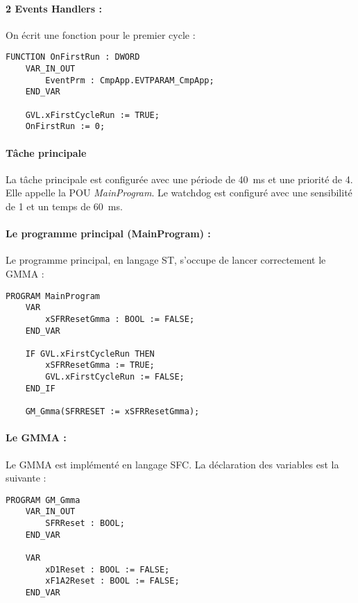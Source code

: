 \paragraph{2 Events Handlers :}
On écrit une fonction pour le premier cycle :
\begin{lstlisting}[language=ST]
FUNCTION OnFirstRun : DWORD
    VAR_IN_OUT
        EventPrm : CmpApp.EVTPARAM_CmpApp;
    END_VAR

    GVL.xFirstCycleRun := TRUE;
    OnFirstRun := 0;\end{lstlisting}

\paragraph{Tâche principale}
La tâche principale est configurée avec une période de \SI{40}{\milli\second} et une priorité de 4. Elle appelle la POU \emph{MainProgram}. Le watchdog est configuré avec une sensibilité de 1 et un temps de \SI{60}{\milli\second}.

\paragraph{Le programme principal (MainProgram) :}
Le programme principal, en langage ST, s'occupe de lancer correctement le GMMA :
\begin{lstlisting}[language=ST]
PROGRAM MainProgram
    VAR
        xSFRResetGmma : BOOL := FALSE;
    END_VAR

    IF GVL.xFirstCycleRun THEN
        xSFRResetGmma := TRUE;
        GVL.xFirstCycleRun := FALSE;
    END_IF

    GM_Gmma(SFRRESET := xSFRResetGmma);\end{lstlisting}

\paragraph{Le GMMA :}
Le GMMA est implémenté en langage SFC. La déclaration des variables est la suivante :
\begin{lstlisting}[language=ST]
PROGRAM GM_Gmma
    VAR_IN_OUT 
        SFRReset : BOOL;
    END_VAR
    
    VAR
        xD1Reset : BOOL := FALSE;
        xF1A2Reset : BOOL := FALSE;
    END_VAR\end{lstlisting}


